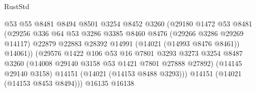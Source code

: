 \begin{lexlean}{RustStd}
\begin{coremodule}
                                              @53
                                              @55
                                              @8481
                                              @8494
                                              @8501
                                              @3254
                                              @8452
                                              @3260
                                              (@29180
                                                @1472
                                                @53
                                                @8481
                                                (@29256
                                                  @336
                                                  @64
                                                  @53
                                                  @3286
                                                  @3385
                                                  @8460
                                                  @8476
                                                  (@29266 @3286 @29269 @14117)
                                                  @22879
                                                  @22883
                                                  @28392
                                                  @14991
                                                  (@14021 (@14993 @8476 @8461))
                                                  @14061))
                                              (@29576
                                                @1422
                                                @106
                                                @53
                                                @16
                                                @7801
                                                @3293
                                                @3273
                                                @3254
                                                @8487
                                                @3260
                                                (@14008 @29140 @3158 @53 @1421 @7801 @27888 @27892)
                                                (@14145 @29140 @3158)
                                                @14151
                                                (@14021 (@14153 @8488 @3293)))
                                              @14151
                                              (@14021 (@14153 @8453 @8494)))
                                            @16135
                                            @16138

\end{coremodule}
\end{lexlean}
